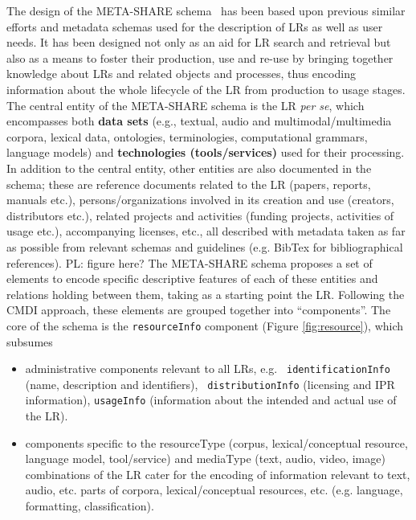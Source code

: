 \documentclass{llncs}
\begin{document}
The design of the META-SHARE schema~\cite{gavrilidou2012metashare} has been based upon previous similar efforts and metadata schemas used for the description of LRs as well as user needs. It has been designed not only as an aid for LR search and retrieval but also as a means to foster their production, use and re-use by bringing together knowledge about LRs and related objects and processes, thus encoding information about the whole lifecycle of the LR from production to usage stages.
The central entity of the META-SHARE schema is the LR \textit{per se}, which encompasses both {\bf data sets} (e.g., textual, audio and multimodal/multimedia corpora, lexical data, ontologies, terminologies, computational grammars, language models) and {\bf technologies (tools/services)} used for their processing. 
In addition to the central entity, other entities are also documented in the schema; these are reference documents related to the LR (papers, reports,
manuals etc.), persons/organizations involved in its creation and use (creators, distributors etc.), related projects and activities (funding projects,
activities of usage etc.), accompanying licenses, etc., all described with metadata taken as far as possible from relevant schemas and guidelines (e.g. BibTex for bibliographical references). {PL: figure here?}
The META-SHARE schema proposes a set of elements to encode specific descriptive
features of each of these entities and relations holding between them, taking as
a starting point the LR. Following the CMDI approach, these elements are grouped
together into ``components''. The core of the schema is the {\tt resourceInfo}
component (Figure \ref{fig:resource}), which subsumes 
\begin{itemize}
\item administrative components relevant to all LRs, e.g. {\tt
    identificationInfo} (name, description and identifiers), {\tt
    distributionInfo} (licensing and IPR information), {\tt usageInfo}
    (information about the intended and actual use of the LR).
\item components specific to the resourceType (corpus, lexical/conceptual resource, language model, tool/service) and mediaType (text, audio, video, image) combinations of the LR cater for the encoding of information relevant to text, audio, etc. parts of corpora, lexical/conceptual resources, etc. (e.g. language, formatting, classification).
\end{itemize} 
\end{document}
